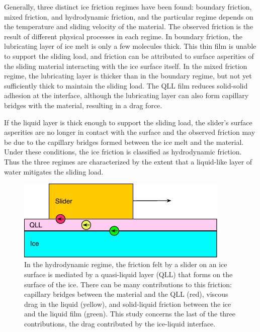 Generally, three distinct ice friction regimes have been found:
boundary friction, mixed friction, and hydrodynamic friction, and the
particular regime depends on the temperature and sliding velocity of
the
material.\cite{Bhushan2002,Kietzig2009,Kietzig2010,Persson2015,Tuononen2016}
The observed friction is the result of different physical processes in
each regime. In boundary friction, the lubricating layer of ice melt
is only a few molecules thick. This thin film is unable to support the
sliding load, and friction can be attributed to surface asperities of
the sliding material interacting with the ice surface
itself.\cite{Bhushan2002} In the mixed friction regime, the
lubricating layer is thicker than in the boundary regime, but not yet
sufficiently thick to maintain the sliding load. The QLL film reduces
solid-solid adhesion at the interface, although the lubricating layer
can also form capillary bridges with the material, resulting in a drag
force.\cite{Kietzig2009,Kietzig2010}

If the liquid layer is thick enough to support the sliding load, the
slider's surface asperities are no longer in contact with the surface
and the observed friction may be due to the capillary bridges formed
between the ice melt and the material. Under these conditions, the ice
friction is classified as hydrodynamic
friction.\cite{Kietzig2009,Kietzig2010} Thus the three regimes are
characterized by the extent that a liquid-like layer of water
mitigates the sliding load.

\begin{figure}
\includegraphics[width=4in]{Figures/QLLsketch}
\caption{\label{fig:QLLsketch} In the hydrodynamic regime, the
  friction felt by a slider on an ice surface is mediated by a
  quasi-liquid layer (QLL) that forms on the surface of the ice.
  There can be many contributions to this friction: capillary bridges
  between the material and the QLL (red), viscous drag in the liquid
  (yellow), and solid-liquid friction between the ice and the liquid
  film (green). This study concerns the last of the three
  contributions, the drag contributed by the ice-liquid interface.}
\end{figure}

